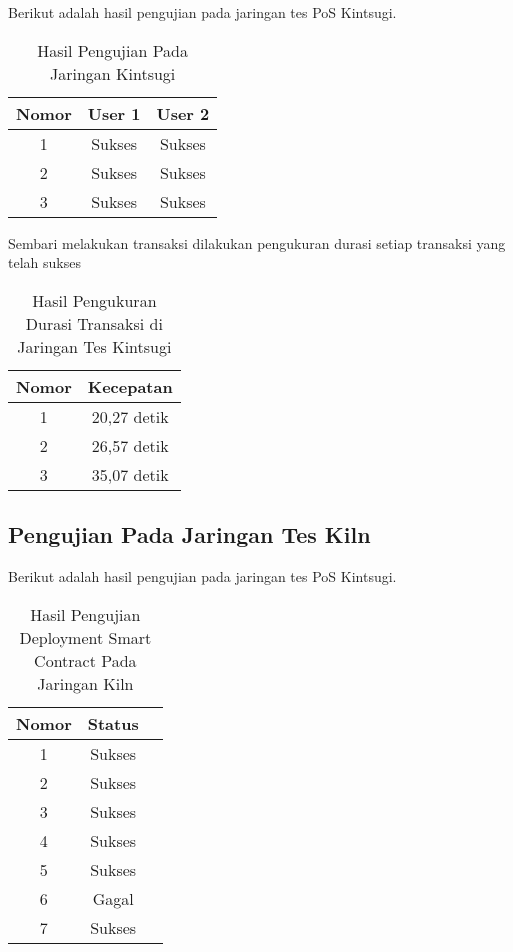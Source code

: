 Berikut adalah hasil pengujian pada jaringan tes PoS Kintsugi.

\begin{longtable}{|c|c|c|}
  \caption{Hasil Pengujian Pada Jaringan Kintsugi}
  \label{tb:kintsugitest}\\
  \hline
  \rowcolor[HTML]{C0C0C0}
  \textbf{Nomor} & \textbf{User 1} & \textbf{User 2} \\
  \hline
  1 & Sukses & Sukses \\
  2 & Sukses & Sukses \\
  3 & Sukses & Sukses \\
  \hline
\end{longtable}

Sembari melakukan transaksi dilakukan pengukuran durasi setiap transaksi yang telah sukses

\begin{longtable}{|c|c|}
  \caption{Hasil Pengukuran Durasi Transaksi di Jaringan Tes Kintsugi}
  \label{tb:kintsugispeed}\\
  \hline
  \rowcolor[HTML]{C0C0C0}
  \textbf{Nomor} & \textbf{Kecepatan} \\
  \hline
  1 & 20,27 detik  \\
  2 & 26,57 detik\\
  3 & 35,07 detik \\
  \hline
\end{longtable}

\subsection{Pengujian Pada Jaringan Tes Kiln}
\label{subsec:teskiln}

Berikut adalah hasil pengujian pada jaringan tes PoS Kintsugi.

\begin{longtable}{|c|c|c|}
  \caption{Hasil Pengujian Deployment Smart Contract Pada Jaringan Kiln}
  \label{tb:kilntest}\\
  \hline
  \rowcolor[HTML]{C0C0C0}
  \textbf{Nomor} & \textbf{Status}\\
  \hline
  1 & Sukses \\
  2 & Sukses \\
  3 & Sukses \\
  4 & Sukses \\
  5 & Sukses \\
  6 & Gagal \\
  7 & Sukses \\
  \hline
\end{longtable}

